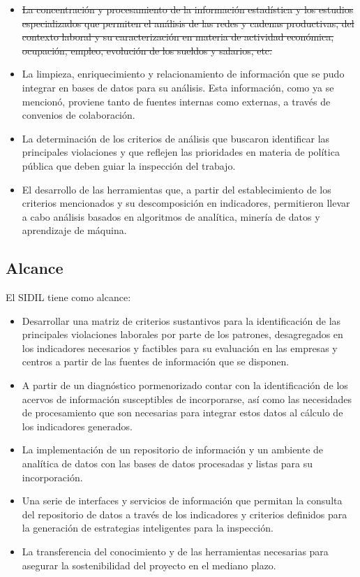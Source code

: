 \documentclass[
]{article}
\providecommand{\tightlist}{%
  \setlength{\itemsep}{0pt}\setlength{\parskip}{0pt}}
\begin{document}
\begin{itemize}
\tightlist
\item
  \st{La concentración y procesamiento de la información estadística y los estudios especializados que permiten el análisis de las redes y cadenas productivas, del contexto laboral y su caracterización en materia de actividad económica, ocupación, empleo, evolución de los sueldos y salarios, etc.}
\item
  La limpieza, enriquecimiento y relacionamiento de información que se pudo integrar en bases de datos para su análisis. Esta información, como ya se mencionó, proviene tanto de fuentes internas como externas, a través de convenios de colaboración.
\item
  La determinación de los criterios de análisis que buscaron identificar las principales violaciones y que reflejen las prioridades en materia de política pública que deben guiar la inspección del trabajo.
\item
  El desarrollo de las herramientas que, a partir del establecimiento de los criterios mencionados y su descomposición en indicadores, permitieron llevar a cabo análisis basados en algoritmos de analítica, minería de datos y aprendizaje de máquina.
\end{itemize}

\hypertarget{introalcance}{%
\subsection{Alcance}\label{introalcance}}

El SIDIL tiene como alcance:

\begin{itemize}
\tightlist
\item
  Desarrollar una matriz de criterios sustantivos para la identificación de las principales violaciones laborales por parte de los patrones, desagregados en los indicadores necesarios y factibles para su evaluación en las empresas y centros a partir de las fuentes de información que se disponen.
\item
  A partir de un diagnóstico pormenorizado contar con la identificación de los acervos de información susceptibles de incorporarse, así como las necesidades de procesamiento que son necesarias para integrar estos datos al cálculo de los indicadores generados.
\item
  La implementación de un repositorio de información y un ambiente de analítica de datos con las bases de datos procesadas y listas para su incorporación.
\item
  Una serie de interfaces y servicios de información que permitan la consulta del repositorio de datos a través de los indicadores y criterios definidos para la generación de estrategias inteligentes para la inspección.
\item
  La transferencia del conocimiento y de las herramientas necesarias para asegurar la sostenibilidad del proyecto en el mediano plazo.
\end{itemize}
\end{document}
